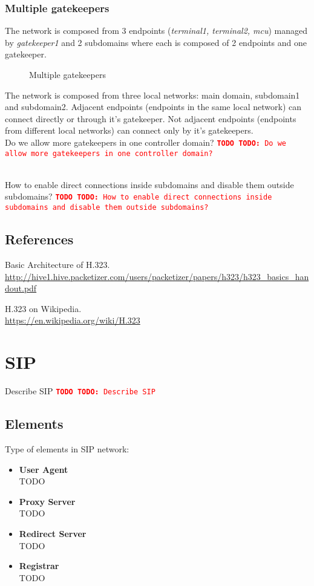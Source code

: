 \documentclass[a4paper]{report}
\newcommand{\TODO}[1]{%
\def\empty{}%
\def\prvniparametr{#1}%
\ifx\prvniparametr\empty%
\begingroup\tt\textcolor{red}{\noindent\textbf{TODO}}\endgroup
\else%
\begingroup\tt\textcolor{red}{\noindent\textbf{TODO:}\ #1}\endgroup
\fi%
}
\newcommand{\graph}[4]{
\begin{figure}[h!]
\centering\scalebox{\ifx&#4& 0.7 \else #4 \fi}{}
\label{#1}
\caption{#3}
\end{figure}
}
\begin{document}
\subsubsection{Multiple gatekeepers}

The network is composed from 3 endpoints (\emph{terminal1, terminal2, mcu}) managed by \emph{gatekeeper1} and 2 subdomains where each is composed of 2 endpoints and one gatekeeper. 
\graph{graph:h323:gatekeeperMultiple}{graph/h323_gatekeeper_multiple.tex}{Multiple gatekeepers}{0.6}
The network is composed from three local networks: main domain, subdomain1 and subdomain2. Adjacent endpoints (endpoints in the same local network) can connect directly or through it's gatekeeper. Not adjacent endpoints (endpoints from different local networks) can connect only by it's gatekeepers.
\\ \TODO{Do we allow more gatekeepers in one controller domain?}
\\ \TODO{How to enable direct connections inside subdomains and disable them outside subdomains?}

\subsection{References}

\renewcommand{\bibsection}{}
\begin{thebibliography}{1}

Basic Architecture of H.323.
\\ \url{http://hive1.hive.packetizer.com/users/packetizer/papers/h323/h323_basics_handout.pdf}

H.323 on Wikipedia.
\\ \url{https://en.wikipedia.org/wiki/H.323}

\end{thebibliography}


\section{SIP}

\TODO{Describe SIP}

\subsection{Elements}

Type of elements in SIP network:

\begin{itemize}
\item \textbf{User Agent} \\
TODO
\item \textbf{Proxy Server} \\
TODO
\item \textbf{Redirect Server} \\
TODO
\item \textbf{Registrar} \\
TODO
\end{itemize}
\end{document}
